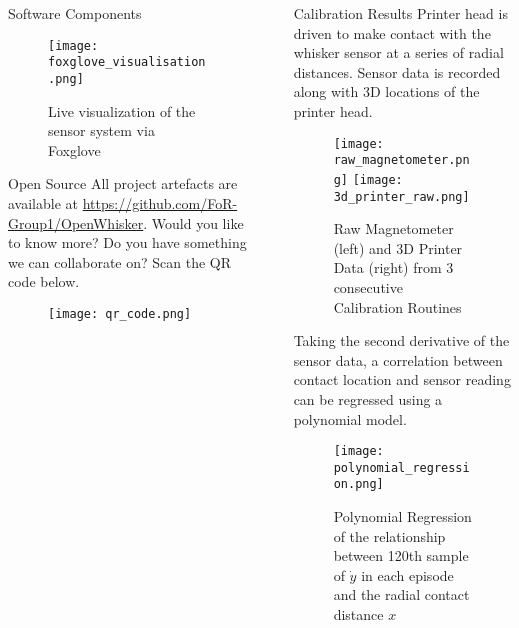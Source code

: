 \documentclass[final]{beamer}
\newlength{\sepwidth}
\newlength{\colwidth}
\newcommand{\separatorcolumn}{\begin{column}{\sepwidth}\end{column}}
\begin{document}
\begin{frame}[t]
\begin{columns}[t]
\begin{column}{\colwidth}
\begin{block}{Software Components}
    \begin{figure}
      \centering
      \texttt{[image: foxglove\_visualisation.png]}
      \caption{Live visualization of the sensor system via Foxglove}
      \label{fig:foxglove}
    \end{figure}
  \end{block}

  \begin{block}{Open Source}
    All project artefacts are available at \url{https://github.com/FoR-Group1/OpenWhisker}. Would you like to know more? Do you have something we can collaborate on? Scan the QR code below.
    \begin{figure}
      \centering
      \texttt{[image: qr\_code.png]}
      \label{fig:github}
    \end{figure}
  \end{block}

\end{column}

\separatorcolumn

\begin{column}{\colwidth}

  \begin{block}{Calibration Results}
    Printer head is driven to make contact with the whisker sensor at a series of radial distances. Sensor data is recorded along with 3D locations of the printer head.

    \begin{figure}
      \centering
      \texttt{[image: raw\_magnetometer.png]}
      \hspace{1pt}
      \texttt{[image: 3d\_printer\_raw.png]}
      \caption{Raw Magnetometer (left) and 3D Printer Data (right) from 3 consecutive Calibration Routines}
      \label{fig:calibration_routine}
    \end{figure}

    Taking the second derivative of the sensor data, a correlation between contact location and sensor reading can be regressed using a polynomial model.
  
    \begin{figure}
      \centering
      \texttt{[image: polynomial\_regression.png]}
      \caption{Polynomial Regression of the relationship between 120th sample of \(\dot{y}\) in each episode and the radial contact distance \(x\)}
      \label{fig:polynomial_regression.png}
    \end{figure}


\end{block}
\end{column}
\end{columns}
\end{frame}
\end{document}
